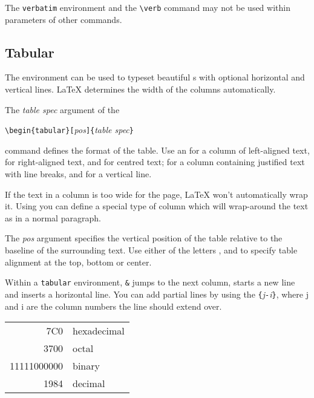 The \texttt{verbatim} environment and the \verb|\verb| command may not be used
within parameters of other commands.


\subsection{Tabular}

\newcommand{\mfr}[1]{\framebox{\rule{0pt}{0.7em}\texttt{#1}}}

The  environment can be used to typeset beautiful
s with optional horizontal and vertical lines. \LaTeX{}
determines the width of the columns automatically.

The \emph{table spec} argument of the 
\begin{lscommand}
\verb|\begin{tabular}[|\emph{pos}\verb|]{|\emph{table spec}\verb|}|
\end{lscommand} 
\noindent command defines the format of the table. Use an \mfr{l} for a column of
left-aligned text, \mfr{r} for right-aligned text, and \mfr{c} for
centred text; \mfr{p\{\emph{width}\}} for a column containing justified
text with line breaks, and \mfr{|} for a vertical line.

If the text in a column is too wide for the page, \LaTeX{} won't
automatically wrap it. Using \mfr{p\{\emph{width}\}} you can define
a special type of column which will wrap-around the text as in a normal paragraph.

The \emph{pos} argument specifies the vertical position of the table
relative to the baseline of the surrounding text.  Use either of the
letters \mfr{t}, \mfr{b} and \mfr{c} to specify table
alignment at the top, bottom or center.
 
Within a \texttt{tabular} environment, \texttt{\&} jumps to the next
column, \ci{\bs} starts a new line and  inserts a horizontal
line.  You can add partial lines by using the \texttt{\{}\emph{j}\texttt{-}\emph{i}\texttt{\}},
where j and i are the column numbers the line should extend over.


\begin{example}
\begin{tabular}{|r|l|}
\hline
7C0 & hexadecimal \\
3700 & octal \\ \cline{2-2}
11111000000 & binary \\
\hline \hline
1984 & decimal \\
\hline
\end{tabular}
\end{example}

